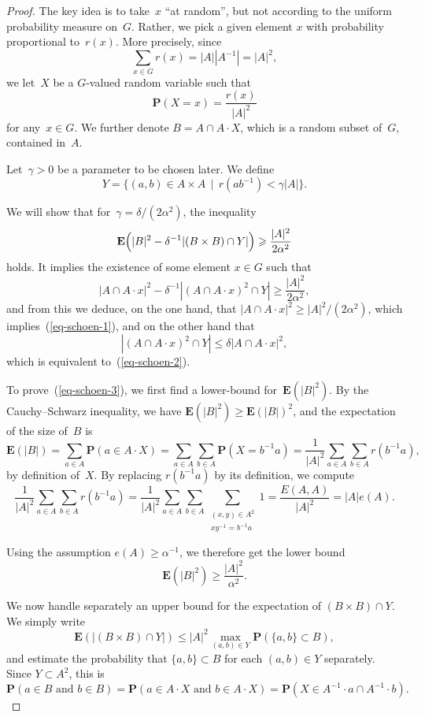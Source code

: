 \documentclass[12pt]{amsart}
\renewcommand{\leq}{\leqslant}
\renewcommand{\geq}{\geqslant}
\numberwithin{equation}{section}
\newcommand{\proba}{\mathbf{P}}
\newcommand{\expect}{\mathbf{E}}
\theoremstyle{plain}
\theoremstyle{remark}
\theoremstyle{definition}
\renewcommand{\geq}{\geqslant}
\renewcommand{\leq}{\leqslant}
\begin{document}
\begin{proof}
  The key idea is to take~$x$ ``at random'', but not according to the
  uniform probability measure on~$G$. Rather, we pick a given element
  $x$ with probability proportional to~$r(x)$. More precisely, since
  $$
  \sum_{x\in G}r(x)=|A||A^{-1}|=|A|^2,
  $$
  we let~$X$ be a $G$-valued random variable such that 
  $$
  \proba(X=x)=\frac{r(x)}{|A|^2}
  $$
  for any~$x\in G$.  We further denote $B=A\cap A\cdot X$, which is a
  random subset of~$G$, contained in~$A$.

  Let~$\gamma>0$ be a parameter to be chosen later. We define
  $$
  Y=\{(a,b)\in A\times A\,\mid\, r(ab^{-1})<\gamma|A|\}.
  $$
  
  We will show that for~$\gamma=\delta/(2\alpha^2)$, the inequality
  \begin{equation}\label{eq-schoen-3}
    \expect\Bigl( |B|^2 -\delta^{-1}|(B\times B)\cap Y| \Bigr)\geq
    \frac{|A|^2}{2\alpha^2}
  \end{equation}
  holds. It implies the existence of some element $x\in G$ such that
  $$
  |A\cap A\cdot x|^2 -\delta^{-1}|(A\cap A\cdot x)^2\cap Y|\geq
  \frac{|A|^2}{2\alpha^2},
  $$
  and from this we deduce, on the one hand, that $|A\cap A\cdot x|^2\geq
  |A|^2/(2\alpha^2)$, which implies~(\ref{eq-schoen-1}), and on the
  other hand that
  $$
  |(A\cap A\cdot x)^2\cap Y|\leq \delta|A\cap A\cdot x|^2,
  $$
  which is equivalent to~(\ref{eq-schoen-2}).

  To prove~(\ref{eq-schoen-3}), we first find a lower-bound
  for~$\expect(|B|^2)$. By the Cauchy--Schwarz inequality, we have
  $\expect(|B|^2)\geq \expect(|B|)^2$, and the expectation of the size
  of~$B$ is
  $$
  \expect(|B|)=\sum_{a\in A}\proba(a\in A\cdot X)= \sum_{a\in
    A}\sum_{b\in A}\proba(X=b^{-1}a)= \frac{1}{|A|^2}\sum_{a\in
    A}\sum_{b\in A}r(b^{-1}a),
  $$
  by definition of~$X$. By replacing $r(b^{-1}a)$ by its definition, we
  compute
  $$
  \frac{1}{|A|^2}\sum_{a\in A}\sum_{b\in A}r(b^{-1}a)=
  \frac{1}{|A|^2}\sum_{a\in A}\sum_{b\in A}\sum_{\substack{(x,y)\in
      A^2\\xy^{-1}=b^{-1}a}}1=\frac{E(A,A)}{|A|^2}=|A|e(A).
  $$

  Using the assumption $e(A)\geq \alpha^{-1}$, we therefore get the
  lower bound
  $$
  \expect(|B|^2)\geq \frac{|A|^2}{\alpha^2}.
  $$

  We now handle separately an upper bound for the expectation of
  $(B\times B)\cap Y$. We simply write
  $$
  \expect(|(B\times B)\cap Y|)\leq |A|^2\max_{(a,b)\in Y}
  \proba(\{a,b\}\subset B),
  $$
  and estimate the probability that $\{a,b\}\subset B$ for each
  $(a,b)\in Y$ separately. Since $Y\subset A^2$, this is
  $$
  \proba(a\in B\text{ and } b\in B)=\proba(a\in A\cdot X\text{ and }
  b\in A\cdot X) =\proba(X\in A^{-1}\cdot a\cap A^{-1}\cdot b).
  $$


\end{proof}
\end{document}
